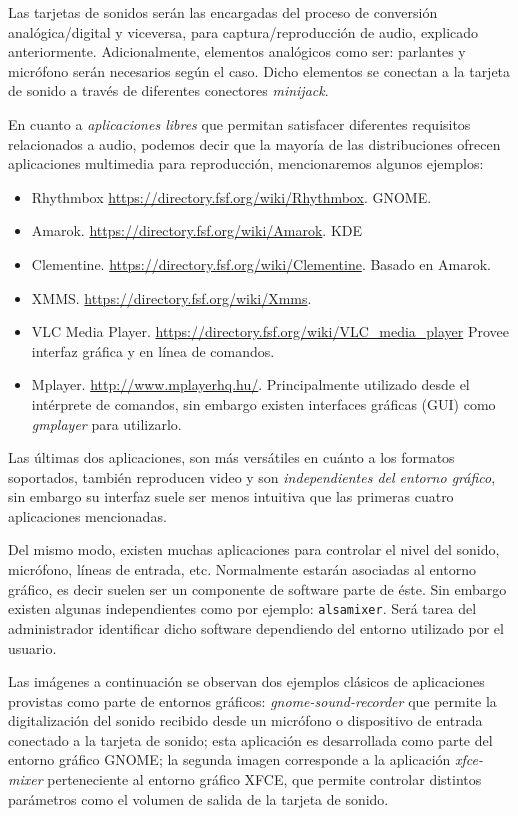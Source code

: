 \documentclass[12pt]{article}
\begin{document}
Las tarjetas de sonidos serán las encargadas del proceso de conversión 
analógica/digital y viceversa, para captura/reproducción de audio, explicado 
anteriormente. Adicionalmente, elementos analógicos como ser: parlantes y 
micrófono serán necesarios según el caso. Dicho elementos se conectan 
a la tarjeta de sonido a través de diferentes conectores {\it minijack}.  

En cuanto a {\it aplicaciones libres} que permitan satisfacer diferentes
requisitos relacionados a audio, podemos decir que la mayoría de las distribuciones
ofrecen aplicaciones multimedia para reproducción, mencionaremos algunos 
ejemplos:

\begin{itemize}
\item Rhythmbox \url{https://directory.fsf.org/wiki/Rhythmbox}. GNOME. 
\item Amarok. \url{https://directory.fsf.org/wiki/Amarok}. KDE 
\item Clementine. \url{https://directory.fsf.org/wiki/Clementine}. 
Basado en Amarok. 
\item XMMS. \url{https://directory.fsf.org/wiki/Xmms}. 
\item VLC Media Player. \url{https://directory.fsf.org/wiki/VLC\_media\_player}
Provee interfaz gráfica y en línea de comandos. 
\item Mplayer. \url{http://www.mplayerhq.hu/}. Principalmente utilizado 
desde el intérprete de comandos, sin embargo existen interfaces gráficas
(GUI) como {\it gmplayer} para utilizarlo. 
\end{itemize}

Las últimas dos aplicaciones, son más versátiles en cuánto a los formatos soportados, 
también reproducen video y son {\it independientes del entorno gráfico}, sin embargo 
su interfaz suele ser menos intuitiva que las primeras cuatro aplicaciones 
mencionadas. 
 
Del mismo modo, existen muchas aplicaciones para controlar el nivel del sonido, micrófono, 
líneas de entrada, etc. Normalmente estarán asociadas al entorno gráfico, es decir suelen ser
un componente de software parte de éste. Sin embargo existen algunas independientes como por ejemplo:
{\tt alsamixer}. Será tarea del administrador identificar dicho software dependiendo 
del entorno utilizado por el usuario. 

Las imágenes a continuación se observan dos ejemplos clásicos de aplicaciones provistas
como parte de entornos gráficos: {\it gnome-sound-recorder} que permite la 
digitalización del sonido recibido desde un micrófono o dispositivo de 
entrada conectado a la tarjeta de sonido; esta aplicación es desarrollada como 
parte del entorno gráfico GNOME; la segunda imagen corresponde a la aplicación 
{\it xfce-mixer} perteneciente al entorno gráfico XFCE, que permite controlar 
distintos parámetros como el volumen de salida de la tarjeta de sonido. 
\end{document}
